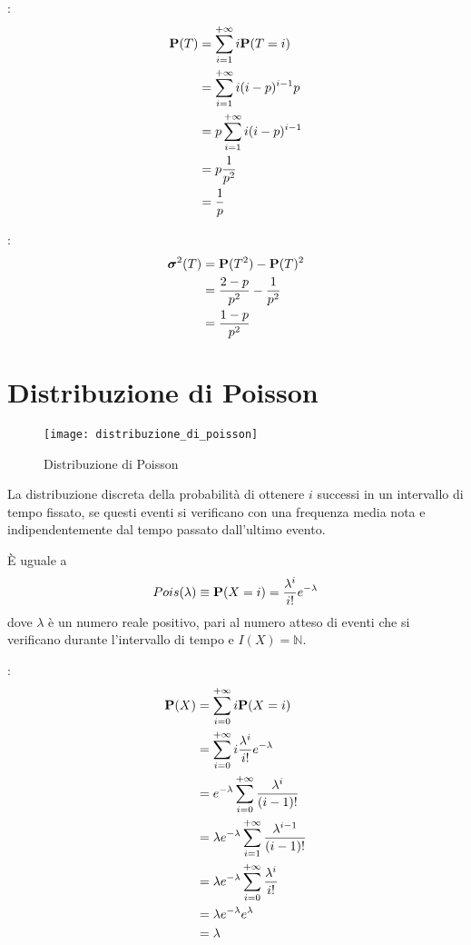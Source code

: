 :
\begin{align*}
  \mathbf{P}(T) &= \sum_{i=1}^{+ \infty} i \mathbf{P}(T = i) \\
  &= \sum_{i=1}^{+ \infty} i (i - p)^{i-1} p \\
  &= p \sum_{i=1}^{+ \infty} i (i - p)^{i-1} \\
  &= p \frac{1}{p^2} \\
  &= \frac{1}{p}
\end{align*}

:
\begin{align*}
  \boldsymbol\sigma^2(T) &= \mathbf{P}(T^2) - \mathbf{P}(T)^2 \\
  &= \frac{2-p}{p^2} - \frac{1}{p^2} \\
  &= \frac{1-p}{p^2}
\end{align*}


\section{Distribuzione di Poisson} %
\begin{figure*}
  \texttt{[image: distribuzione\_di\_poisson]}
  \caption{Distribuzione di Poisson} 
\end{figure*}

\begin{definition}
  \label{def:distribuzione_di_poisson}
  La distribuzione discreta della probabilità di ottenere \( i \) successi in un intervallo di tempo fissato,
  se questi eventi si verificano con una frequenza media nota e indipendentemente dal tempo passato dall'ultimo evento.

  È uguale a
  \[
    Pois(\lambda) \equiv \mathbf{P}(X = i) = \frac{\lambda^i}{i!} e^{- \lambda}
  \]
  dove \( \lambda \) è un numero reale positivo, pari al numero atteso di eventi che si verificano durante l'intervallo di tempo e \( I(X) = \mathbb{N} \).
\end{definition}

:
\begin{align*}
  \mathbf{P}(X) &= \sum_{i=0}^{+ \infty} i \mathbf{P}(X = i) \\
  &= \sum_{i=0}^{+ \infty} i \frac{\lambda^i}{i!} e^{- \lambda} \\
  &= e^{- \lambda} \sum_{i=0}^{+ \infty} \frac{\lambda^i}{(i-1)!} \\
  &= \lambda e^{- \lambda} \sum_{i=1}^{+ \infty} \frac{\lambda^{i-1}}{(i-1)!} \\
  &= \lambda e^{- \lambda} \sum_{i=0}^{+ \infty} \frac{\lambda^{i}}{i!} \\
  &= \lambda e^{- \lambda} e^\lambda \\
  &= \lambda
\end{align*}

